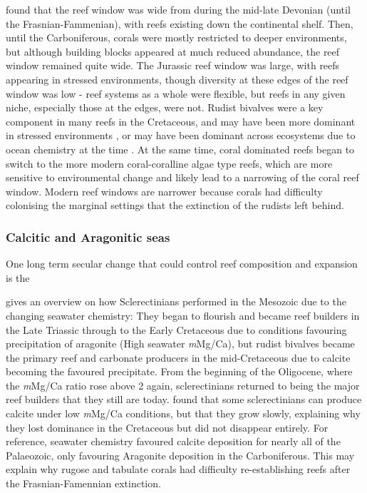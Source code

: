 \documentclass[11pt,a4paper]{article}
\begin{document}
\cite{Leinfelder1999} found that the reef window was wide from during the mid-late Devonian (until the Frasnian-Fammenian), with reefs existing down the continental shelf. Then, until the Carboniferous, corals were mostly restricted to deeper environments, but although building blocks appeared at much reduced abundance, the reef window remained quite wide. The Jurassic reef window was large, with reefs appearing in stressed environments, though diversity at these edges of the reef window was low - reef systems as a whole were flexible, but reefs in any given niche, especially those at the edges, were not. Rudist bivalves were a key component in many reefs in the Cretaceous, and may have been more dominant in stressed environments \citep{Leinfelder1999}, or may have been dominant across ecosystems due to ocean chemistry at the time \citep{Ries2006}. At the same time, coral dominated reefs began to switch to the more modern coral-coralline algae type reefs, which are more sensitive to environmental change and likely lead to a narrowing of the coral reef window. Modern reef windows are narrower because corals had difficulty colonising the marginal settings that the extinction of the rudists left behind.

\subsubsection{Calcitic and Aragonitic seas}

One long term secular change that could control reef composition and expansion is the 

\cite{Ries2006} gives an overview on how Sclerectinians performed in the Mesozoic due to the changing seawater chemistry: They began to flourish and became reef builders in the Late Triassic through to the Early Cretaceous due to conditions favouring precipitation of aragonite (High seawater \textit{m}Mg/Ca), but rudist bivalves became the primary reef and carbonate producers in the mid-Cretaceous due to calcite becoming the favoured precipitate. From the beginning of the Oligocene, where the \textit{m}Mg/Ca ratio rose above 2 again, sclerectinians returned to being the major reef builders that they still are today. \cite{Ries2006} found that some sclerectinians can produce calcite under low \textit{m}Mg/Ca conditions, but that they grow slowly, explaining why they lost dominance in the Cretaceous but did not disappear entirely.
For reference, seawater chemistry favoured calcite deposition for nearly all of the Palaeozoic, only favouring Aragonite deposition in the Carboniferous. This may explain why rugose and tabulate corals had difficulty re-establishing reefs after the Frasnian-Famennian extinction.
\end{document}
